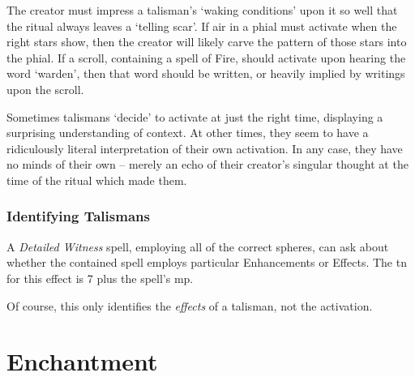 \begin{multicols}{2}
The creator must impress a talisman's `waking conditions' upon it so well that the ritual always leaves a `telling scar'.
If air in a phial must activate when the right stars show, then the creator will likely carve the pattern of those stars into the phial.
If a scroll, containing a spell of Fire, should activate upon hearing the word `warden', then that word should be written, or heavily implied by writings upon the scroll.

Sometimes talismans `decide' to activate at just the right time, displaying a surprising understanding of context.
At other times, they seem to have a ridiculously literal interpretation of their own activation.
In any case, they have no minds of their own -- merely an echo of their creator's singular thought at the time of the ritual which made them.

\subsubsection{Identifying Talismans}

A \textit{Detailed Witness} spell, employing all of the correct spheres, can ask about whether the contained spell employs particular Enhancements or Effects.
The \gls{tn} for this effect is 7 plus the spell's \gls{mp}.

Of course, this only identifies the \emph{effects} of a talisman, not the activation.

\end{multicols}

\section{Enchantment}

